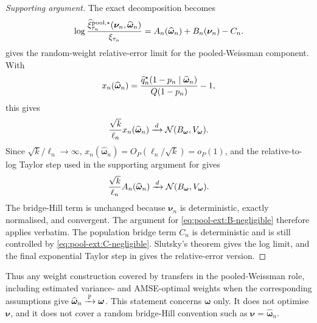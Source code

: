 \begin{proof}[Supporting argument]
The exact decomposition becomes
\[
  \log
  \frac{
    \widehat\xi_{\tau_n}^{\mathrm{pool},\star}
    (\bm\nu_n,\widehat{\bm\omega}_n)
  }{\xi_{\tau_n}}
  =
  A_n(\widehat{\bm\omega}_n)+B_n(\bm\nu_n)-C_n.
\]
 gives the random-weight
relative-error limit for the pooled-Weissman component. With
\[
  x_n(\widehat{\bm\omega}_n)
  =
  \frac{\widehat{q}^{\star}_n(1-p_n\mid\widehat{\bm\omega}_n)}{Q(1-p_n)}-1,
\]
this gives
\[
  \frac{\sqrt{k}}{\ell_n}x_n(\widehat{\bm\omega}_n)
  \xrightarrow{\,d\,}
  \mathcal N(B_{\bm\omega},V_{\bm\omega}).
\]
Since \(\sqrt{k}/\ell_n\to\infty\),
\(x_n(\widehat{\bm\omega}_n)=O_P(\ell_n/\sqrt{k})=o_P(1)\), and the
relative-to-log Taylor step used in the supporting argument for
 gives
\[
  \frac{\sqrt{k}}{\ell_n}A_n(\widehat{\bm\omega}_n)
  \xrightarrow{\,d\,}
  \mathcal N(B_{\bm\omega},V_{\bm\omega}).
\]
The bridge-Hill term is unchanged because \(\bm\nu_n\) is deterministic,
exactly normalised, and convergent. The argument for
\eqref{eq:pool-ext:B-negligible} therefore applies verbatim. The population
bridge term \(C_n\) is deterministic and is still
controlled by \eqref{eq:pool-ext:C-negligible}. Slutsky's theorem gives the
log limit, and the final exponential Taylor step in
 gives the relative-error version.
\end{proof}

Thus any weight construction covered by 
transfers in the pooled-Weissman role,
including estimated variance- and AMSE-optimal weights when the corresponding
assumptions give \(\widehat{\bm\omega}_n\xrightarrow{\,\operatorname{\mathbb{P}}\,}\bm\omega\). This statement
concerns \(\bm\omega\) only. It does not optimise \(\bm\nu\), and it does not
cover a random bridge-Hill convention such as
\(\bm\nu=\widehat{\bm\omega}_n\).

